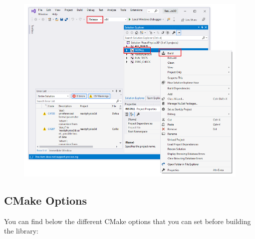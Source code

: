 \documentclass[a4paper,12pt]{article}
\begin{document}
    \begin{figure}
        \centering
        \includegraphics[scale=0.6]{VSInstall.png}
        \label{fig:vsinstall}
    \end{figure}

    \vspace{5.0cm}

     \subsection{CMake Options}
     \label{sec:cmakevariables}

     You can find below the different CMake options that you can set before building the library:
\end{document}
